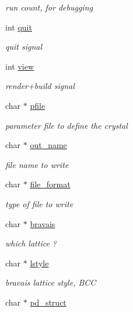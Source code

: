 \begin{DoxyCompactItemize}
\begin{DoxyCompactList}\small\item\em run count, for debugging \end{DoxyCompactList}\item 
int \hyperlink{class_gui_a218cd4709b84a4aa7110bbf43e050c3c}{quit}
\begin{DoxyCompactList}\small\item\em quit signal \end{DoxyCompactList}\item 
int \hyperlink{class_gui_a0ad7bdad878125b0c6a08949e572e109}{view}
\begin{DoxyCompactList}\small\item\em render+build signal \end{DoxyCompactList}\item 
char $\ast$ \hyperlink{class_gui_ad78f3255742971f001f7c509c66ff655}{pfile}
\begin{DoxyCompactList}\small\item\em parameter file to define the crystal \end{DoxyCompactList}\item 
char $\ast$ \hyperlink{class_gui_a29e73c724fb7465a012847876688c405}{out\+\_\+name}
\begin{DoxyCompactList}\small\item\em file name to write \end{DoxyCompactList}\item 
char $\ast$ \hyperlink{class_gui_afe858ad21a3a036632416f887fe06d37}{file\+\_\+format}
\begin{DoxyCompactList}\small\item\em type of file to write \end{DoxyCompactList}\item 
char $\ast$ \hyperlink{class_gui_afeba585e007765820c01f71e7b5f7c87}{bravais}
\begin{DoxyCompactList}\small\item\em which lattice ? \end{DoxyCompactList}\item 
char $\ast$ \hyperlink{class_gui_a39bb625a90cea3d763c46bb68e87ab11}{lstyle}
\begin{DoxyCompactList}\small\item\em bravais lattice style, B\+C\+C \end{DoxyCompactList}\item 
char $\ast$ \hyperlink{class_gui_ad256ded075bfb167743bb388ec301fe4}{pd\+\_\+struct}

\end{DoxyCompactItemize}
